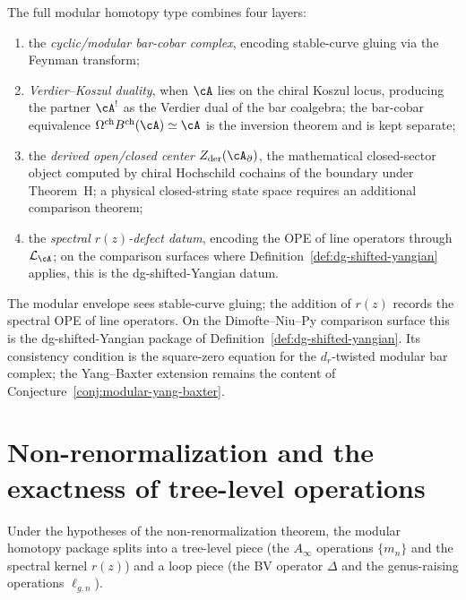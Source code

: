 \begin{remark}
\label{rem:modular-homotopy-type}
The full modular homotopy type combines four layers:
\begin{enumerate}
\item the \emph{cyclic/modular bar-cobar complex}, encoding
 stable-curve gluing via the Feynman transform;
\item \emph{Verdier--Koszul duality}, when $\cA$ lies on the chiral
 Koszul locus, producing the partner $\cA^!$ as the Verdier dual of
 the bar coalgebra; the bar-cobar equivalence
 $\Omega^{\mathrm{ch}}B^{\mathrm{ch}}(\cA)\simeq \cA$ is the
 inversion theorem and is kept separate;
\item the \emph{derived open/closed center}
 $Z_{\mathrm{der}}(\cA_\partial)$, the mathematical closed-sector object
 computed by chiral Hochschild cochains of the boundary under
 Theorem~H; a physical closed-string state space requires an
 additional comparison theorem;
\item the \emph{spectral $r(z)$-defect datum}, encoding the OPE of
 line operators through $\mathcal L_\cA$; on the comparison surfaces
 where Definition~\ref{def:dg-shifted-yangian} applies, this is the
 dg-shifted-Yangian datum.
\end{enumerate}
The modular envelope sees stable-curve gluing; the addition of $r(z)$
records the spectral OPE of line operators.  On the
Dimofte--Niu--Py comparison surface this is the dg-shifted-Yangian
package of Definition~\ref{def:dg-shifted-yangian}.  Its consistency
condition is the square-zero equation for the $d_r$-twisted modular
bar complex; the Yang--Baxter extension remains the content of
Conjecture~\ref{conj:modular-yang-baxter}.
\end{remark}

\section{Non-renormalization and the exactness of tree-level operations}
\label{sec:non-renormalization-tree}

Under the hypotheses of the non-renormalization theorem, the modular
homotopy package splits
into a tree-level piece (the $A_\infty$ operations $\{m_n\}$ and the
spectral kernel $r(z)$) and a loop piece (the BV operator $\Delta$
and the genus-raising operations $\ell_{g,n}$).

